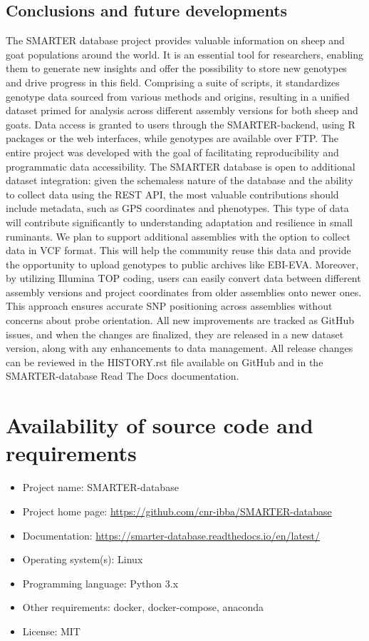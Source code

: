 \documentclass[a4paper,num-refs,gigabyte]{oup-contemporary}
\begin{document}
\subsection{Conclusions and future developments}
The SMARTER database project provides valuable information on sheep and goat populations around the world. It is an essential tool for researchers, enabling them to generate new insights and offer the possibility to store new genotypes and drive progress in this field. Comprising a suite of scripts, it standardizes genotype data sourced from various methods and origins, resulting in a unified dataset primed for analysis across different assembly versions for both sheep and goats. Data access is granted to users through the SMARTER-backend, using R packages or the web interfaces, while genotypes are available over FTP. The entire project was developed with the goal of facilitating reproducibility and programmatic data accessibility.
The SMARTER database is open to additional dataset integration: given the schemaless nature of the database and the ability to collect data using the REST API, the most valuable contributions should include metadata, such as GPS coordinates and phenotypes. This type of data will contribute significantly to understanding adaptation and resilience in small ruminants.
We plan to support additional assemblies with the option to collect data in VCF format. This will help the community reuse this data and provide the opportunity to upload genotypes to public archives like EBI-EVA.
Moreover, by utilizing Illumina TOP coding, users can easily convert data between different assembly versions and project coordinates from older assemblies onto newer ones. This approach ensures accurate SNP positioning across assemblies without concerns about probe orientation.
All new improvements are tracked as GitHub issues\citep{SMARTERDB-GH-ISSUES}, and when the changes are finalized, they are released in a new dataset version, along with any enhancements to data management. All release changes can be reviewed in the HISTORY.rst\citep{SMARTERDB-GH-HISTORY} file available on GitHub and in the SMARTER-database Read The Docs documentation\citep{SMARTERdocs}.

\section{Availability of source code and requirements}

\begin{itemize}
\item Project name: SMARTER-database
\item Project home page: \url{https://github.com/cnr-ibba/SMARTER-database}
\item Documentation: \url{https://smarter-database.readthedocs.io/en/latest/}
\item Operating system(s): Linux
\item Programming language: Python 3.x
\item Other requirements: docker, docker-compose, anaconda
\item License: MIT
\end{itemize}
\end{document}
